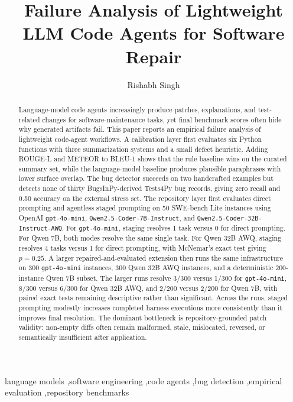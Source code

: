 \documentclass[preprint,12pt]{elsarticle}
\begin{document}
\begin{frontmatter}

\title{Failure Analysis of Lightweight LLM Code Agents for Software Repair}

\author[addr1]{Rishabh Singh}
\address[addr1]{Independent Researcher, Seattle, Washington, United States}

\begin{abstract}
Language-model code agents increasingly produce patches, explanations, and test-related changes for software-maintenance tasks, yet final benchmark scores often hide why generated artifacts fail. This paper reports an empirical failure analysis of lightweight code-agent workflows. A calibration layer first evaluates six Python functions with three summarization systems and a small defect heuristic. Adding ROUGE-L and METEOR to BLEU-1 shows that the rule baseline wins on the curated summary set, while the language-model baseline produces plausible paraphrases with lower surface overlap. The bug detector succeeds on two handcrafted examples but detects none of thirty BugsInPy-derived Tests4Py bug records, giving zero recall and 0.50 accuracy on the external stress set. The repository layer first evaluates direct prompting and agentless staged prompting on 50 SWE-bench Lite instances using OpenAI \texttt{gpt-4o-mini}, \texttt{Qwen2.5-Coder-7B-Instruct}, and \texttt{Qwen2.5-Coder-32B-Instruct-AWQ}. For \texttt{gpt-4o-mini}, staging resolves 1 task versus 0 for direct prompting. For Qwen 7B, both modes resolve the same single task. For Qwen 32B AWQ, staging resolves 4 tasks versus 1 for direct prompting, with McNemar's exact test giving $p=0.25$. A larger repaired-and-evaluated extension then runs the same infrastructure on 300 \texttt{gpt-4o-mini} instances, 300 Qwen 32B AWQ instances, and a deterministic 200-instance Qwen 7B subset. The larger runs resolve 3/300 versus 1/300 for \texttt{gpt-4o-mini}, 8/300 versus 6/300 for Qwen 32B AWQ, and 2/200 versus 2/200 for Qwen 7B, with paired exact tests remaining descriptive rather than significant. Across the runs, staged prompting modestly increases completed harness executions more consistently than it improves final resolution. The dominant bottleneck is repository-grounded patch validity: non-empty diffs often remain malformed, stale, mislocated, reversed, or semantically insufficient after application.
\end{abstract}

\begin{keyword}
language models \sep software engineering \sep code agents \sep bug detection \sep empirical evaluation \sep repository benchmarks
\end{keyword}

\end{frontmatter}
\end{document}
